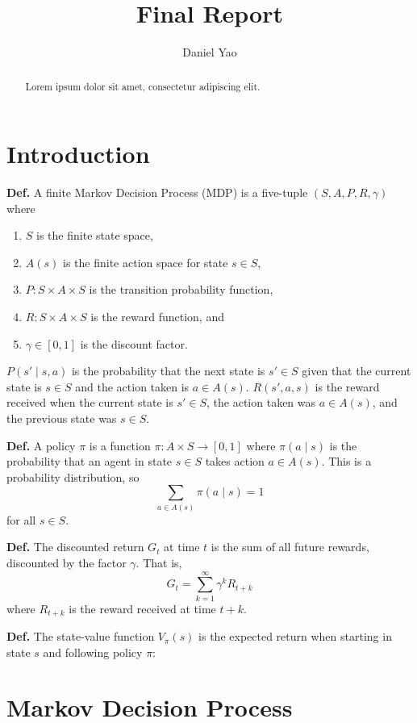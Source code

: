 \documentclass[final,5p,times,twocolumn]{elsarticle}
\begin{document}
\begin{frontmatter}

\title{Final Report}
\author{Daniel Yao}

\begin{abstract}
Lorem ipsum dolor sit amet, consectetur adipiscing elit.
\end{abstract}

\end{frontmatter}

\section{Introduction}
\label{sec:intro}

\textbf{Def.} A finite Markov Decision Process (MDP) is a five-tuple $(S, A, P, R, \gamma)$ where\cite{risk1959}\cite{puterman2014markov}
\begin{enumerate}
    \item $S$ is the finite state space,
    \item $A(s)$ is the finite action space for state $s \in S$,
    \item $P: S \times A \times S$ is the transition probability function,
    \item $R: S \times A \times S$ is the reward function, and 
    \item $\gamma \in [0, 1]$ is the discount factor.
\end{enumerate}
$P(s' \mid s, a)$ is the probability that the next state is $s' \in S$ given that the current state is $s \in S$ and the action taken is $a \in A(s)$. $R(s', a, s)$ is the reward received when the current state is $s' \in S$, the action taken was $a \in A(s)$, and the previous state was $s \in S$.

\textbf{Def.} A policy $\pi$ is a function $\pi: A \times S \to [0, 1]$ where $\pi(a \mid s)$ is the probability that an agent in state $s \in S$ takes action $a \in A(s)$. This is a probability distribution, so 
$$\sum_{a \in A(s)} \pi(a \mid s) = 1$$
for all $s \in S$.

\textbf{Def.} The discounted return $G_{t}$ at time $t$ is the sum of all future rewards, discounted by the factor $\gamma$. That is,
$$G_{t} = \sum_{k=1}^{\infty} \gamma^{k} R_{t+k}$$
where $R_{t+k}$ is the reward received at time $t+k$. 

\textbf{Def.} The state-value function $V_{\pi}(s)$ is the expected return when starting in state $s$ and following policy $\pi$:

\section{Markov Decision Process}
\label{sec:mdp}
\end{document}
